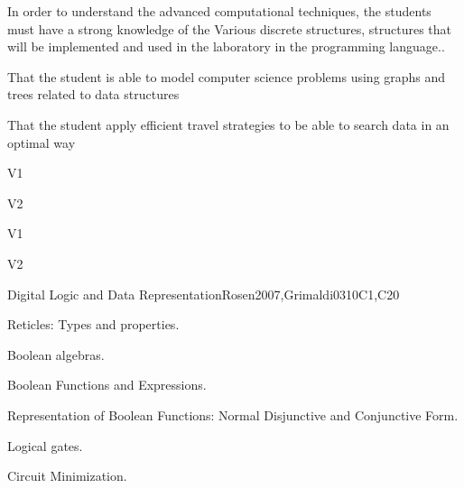 \begin{syllabus}


\begin{justification}
In order to understand the advanced computational techniques, the students must have a strong knowledge of the
Various discrete structures, structures that will be implemented and used in the laboratory in the programming language..
\end{justification}

\begin{goals}
\item That the student is able to model computer science problems using graphs and trees related to data structures
\item That the student apply efficient travel strategies to be able to search data in an optimal way
\end{goals}

\begin{outcomes}{V1}
    \item {}
    \item {}	
    \item {}
\end{outcomes}

\begin{outcomes}{V2}
    \item {}
    \item {}	
    \item {}
\end{outcomes}

\begin{competences}{V1}
    \item {}
    \item {}
    \item {}
\end{competences}

\begin{competences}{V2}
    \item {}
    \item {}
    \item {}
\end{competences}

\begin{unit}{Digital Logic and Data Representation}{}{Rosen2007,Grimaldi03}{10}{C1,C20}
    \begin{topics}
     \item Reticles: Types and properties.
     \item Boolean algebras.
     \item Boolean Functions and Expressions.
     \item Representation of Boolean Functions: Normal Disjunctive and Conjunctive Form.
     \item Logical gates.
     \item Circuit Minimization.
    \end{topics}
 

\end{unit}
\end{syllabus}
